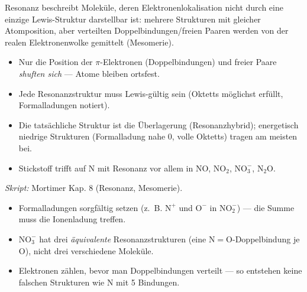 
Resonanz beschreibt Moleküle, deren Elektronenlokalisation nicht durch eine
einzige Lewis-Struktur darstellbar ist: mehrere Strukturen mit gleicher
Atomposition, aber verteilten Doppelbindungen/freien Paaren werden von der
realen Elektronenwolke gemittelt (Mesomerie).

\begin{werkzeugkasten}
\begin{itemize}
  \item Nur die Position der $\pi$-Elektronen (Doppelbindungen) und freier
        Paare \textit{shuften sich} --- Atome bleiben ortsfest.
  \item Jede Resonanzstruktur muss Lewis-gültig sein (Oktetts möglichst
        erfüllt, Formalladungen notiert).
  \item Die tatsächliche Struktur ist die Überlagerung (Resonanzhybrid);
        energetisch niedrige Strukturen (Formalladung nahe 0, volle Oktetts)
        tragen am meisten bei.
  \item Stickstoff trifft auf N mit Resonanz vor allem in $\mathrm{NO}$,
        $\mathrm{NO_2}$, $\mathrm{NO_3^-}$, $\mathrm{N_2O}$.
\end{itemize}
\textit{Skript:} Mortimer Kap. 8 (Resonanz, Mesomerie).
\end{werkzeugkasten}

\begin{achtung}
\begin{itemize}
  \item Formalladungen sorgfältig setzen (z.\ B. $\mathrm{N^+}$ und $\mathrm{O^-}$
        in $\mathrm{NO_2^-}$) --- die Summe muss die Ionenladung treffen.
  \item $\mathrm{NO_3^-}$ hat drei \textit{äquivalente} Resonanzstrukturen (eine
        $\mathrm{N=O}$-Doppelbindung je O), nicht drei verschiedene Moleküle.
  \item Elektronen zählen, bevor man Doppelbindungen verteilt --- so entstehen
        keine falschen Strukturen wie $\mathrm{N}$ mit 5 Bindungen.
\end{itemize}
\end{achtung}
